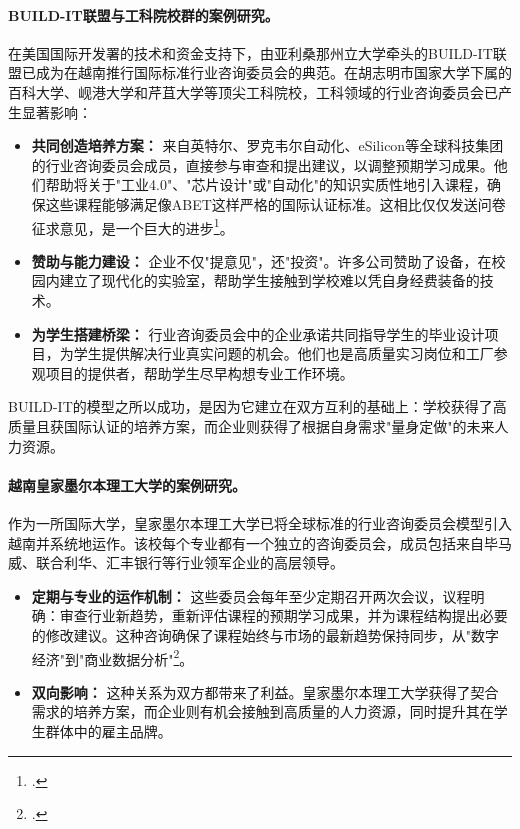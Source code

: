 \paragraph{BUILD-IT联盟与工科院校群的案例研究。} 在美国国际开发署的技术和资金支持下，由亚利桑那州立大学牵头的BUILD-IT联盟已成为在越南推行国际标准行业咨询委员会的典范。在胡志明市国家大学下属的百科大学、岘港大学和芹苴大学等顶尖工科院校，工科领域的行业咨询委员会已产生显著影响：
\begin{itemize}
    \item \textbf{共同创造培养方案：} 来自英特尔、罗克韦尔自动化、eSilicon等全球科技集团的行业咨询委员会成员，直接参与审查和提出建议，以调整预期学习成果。他们帮助将关于"工业4.0"、"芯片设计"或"自动化"的知识实质性地引入课程，确保这些课程能够满足像ABET这样严格的国际认证标准。这相比仅仅发送问卷征求意见，是一个巨大的进步\footcite{buildit_iab_impact}。
    \item \textbf{赞助与能力建设：} 企业不仅"提意见"，还"投资"。许多公司赞助了设备，在校园内建立了现代化的实验室，帮助学生接触到学校难以凭自身经费装备的技术。
    \item \textbf{为学生搭建桥梁：} 行业咨询委员会中的企业承诺共同指导学生的毕业设计项目，为学生提供解决行业真实问题的机会。他们也是高质量实习岗位和工厂参观项目的提供者，帮助学生尽早构想专业工作环境。
\end{itemize}
BUILD-IT的模型之所以成功，是因为它建立在双方互利的基础上：学校获得了高质量且获国际认证的培养方案，而企业则获得了根据自身需求"量身定做"的未来人力资源。

\paragraph{越南皇家墨尔本理工大学的案例研究。} 作为一所国际大学，皇家墨尔本理工大学已将全球标准的行业咨询委员会模型引入越南并系统地运作。该校每个专业都有一个独立的咨询委员会，成员包括来自毕马威、联合利华、汇丰银行等行业领军企业的高层领导。
\begin{itemize}
    \item \textbf{定期与专业的运作机制：} 这些委员会每年至少定期召开两次会议，议程明确：审查行业新趋势，重新评估课程的预期学习成果，并为课程结构提出必要的修改建议。这种咨询确保了课程始终与市场的最新趋势保持同步，从"数字经济"到"商业数据分析"\footcite{rmit_iab_2023}。
    \item \textbf{双向影响：} 这种关系为双方都带来了利益。皇家墨尔本理工大学获得了契合需求的培养方案，而企业则有机会接触到高质量的人力资源，同时提升其在学生群体中的雇主品牌。
\end{itemize}

